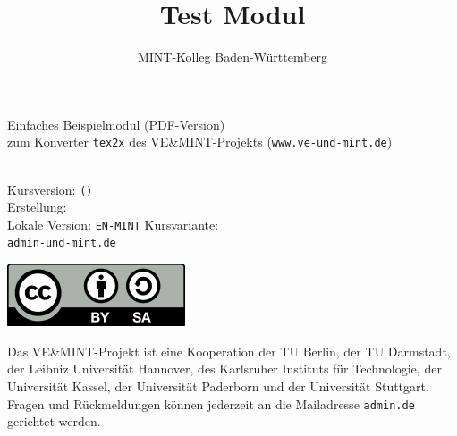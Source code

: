 



\graphicspath{{./../static/}}

\title{Test Modul}
\author{MINT-Kolleg Baden-W\"urttemberg}



\MSetSubject{\MINTMathematics}

\begin{framed}
\begin{center}
\LARGE
Einfaches Beispielmodul (PDF-Version)\\
\large
zum Konverter \texttt{tex2x} des VE\&MINT-Projekts (\texttt{www.ve-und-mint.de})
\end{center}
\ \\

Kursversion:  \texttt{\MSignatureMain (\MSignatureVersion)}\\
Erstellung:  \MSignatureDate\\
Lokale Version:  \texttt{EN-MINT}
Kursvariante: \texttt{\MSignatureVariant}\\
\scriptsize \texttt{admin\@@ve-und-mint.de}
\end{framed}


\begin{center}
\includegraphics[scale=0.45]{cclbysa.png}
\end{center}


Das VE\&MINT-Projekt ist eine Kooperation der TU Berlin, der TU Darmstadt, der Leibniz Universität Hannover, des Karlsruher
Instituts für Technologie, der Universität Kassel, der Universität Paderborn und der Universität Stuttgart.
Fragen und Rückmeldungen können jederzeit an die Mailadresse \texttt{admin\@@veundmint.de} gerichtet werden.

\Mtableofcontents


\MPrintIndex


